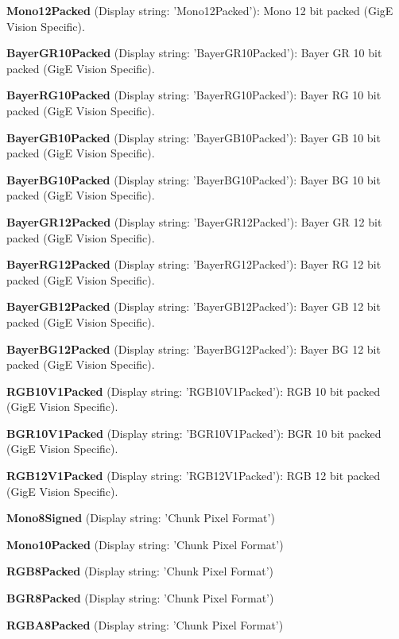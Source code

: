 \begin{DoxyItemize}
\item {\bfseries Mono12\+Packed} (Display string\+: 'Mono12\+Packed')\+: Mono 12 bit packed (Gig\+E Vision Specific).
\item {\bfseries Bayer\+G\+R10\+Packed} (Display string\+: 'Bayer\+G\+R10\+Packed')\+: Bayer G\+R 10 bit packed (Gig\+E Vision Specific).
\item {\bfseries Bayer\+R\+G10\+Packed} (Display string\+: 'Bayer\+R\+G10\+Packed')\+: Bayer R\+G 10 bit packed (Gig\+E Vision Specific).
\item {\bfseries Bayer\+G\+B10\+Packed} (Display string\+: 'Bayer\+G\+B10\+Packed')\+: Bayer G\+B 10 bit packed (Gig\+E Vision Specific).
\item {\bfseries Bayer\+B\+G10\+Packed} (Display string\+: 'Bayer\+B\+G10\+Packed')\+: Bayer B\+G 10 bit packed (Gig\+E Vision Specific).
\item {\bfseries Bayer\+G\+R12\+Packed} (Display string\+: 'Bayer\+G\+R12\+Packed')\+: Bayer G\+R 12 bit packed (Gig\+E Vision Specific).
\item {\bfseries Bayer\+R\+G12\+Packed} (Display string\+: 'Bayer\+R\+G12\+Packed')\+: Bayer R\+G 12 bit packed (Gig\+E Vision Specific).
\item {\bfseries Bayer\+G\+B12\+Packed} (Display string\+: 'Bayer\+G\+B12\+Packed')\+: Bayer G\+B 12 bit packed (Gig\+E Vision Specific).
\item {\bfseries Bayer\+B\+G12\+Packed} (Display string\+: 'Bayer\+B\+G12\+Packed')\+: Bayer B\+G 12 bit packed (Gig\+E Vision Specific).
\item {\bfseries R\+G\+B10\+V1\+Packed} (Display string\+: 'R\+G\+B10\+V1\+Packed')\+: R\+G\+B 10 bit packed (Gig\+E Vision Specific).
\item {\bfseries B\+G\+R10\+V1\+Packed} (Display string\+: 'B\+G\+R10\+V1\+Packed')\+: B\+G\+R 10 bit packed (Gig\+E Vision Specific).
\item {\bfseries R\+G\+B12\+V1\+Packed} (Display string\+: 'R\+G\+B12\+V1\+Packed')\+: R\+G\+B 12 bit packed (Gig\+E Vision Specific).
\item {\bfseries Mono8\+Signed} (Display string\+: 'Chunk Pixel Format')
\item {\bfseries Mono10\+Packed} (Display string\+: 'Chunk Pixel Format')
\item {\bfseries R\+G\+B8\+Packed} (Display string\+: 'Chunk Pixel Format')
\item {\bfseries B\+G\+R8\+Packed} (Display string\+: 'Chunk Pixel Format')
\item {\bfseries R\+G\+B\+A8\+Packed} (Display string\+: 'Chunk Pixel Format')

\end{DoxyItemize}
